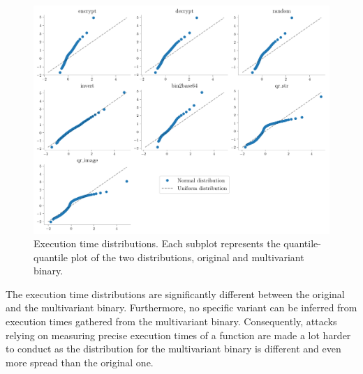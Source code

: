 \begin{figure}[h]
    \includegraphics[width=\linewidth]{plots/qqplots.pdf}
    \caption{Execution time distributions. Each subplot represents the quantile-quantile plot of the two distributions, original and multivariant binary. }
    \label{rq3:diversity:times}
\end{figure}



\begin{tcolorbox}[title=Answer to RQ3.,boxrule=2pt,arc=.3em,boxsep=1.5mm]
    
The execution time distributions are significantly different between the original and the multivariant binary. Furthermore, no specific variant can be inferred from execution times gathered from the multivariant binary. 
Consequently, attacks relying on measuring precise execution times \cite{blackhatpaper} of a function are made a lot harder to conduct as the distribution for the multivariant binary is different and even more spread than the original one.

\end{tcolorbox}
